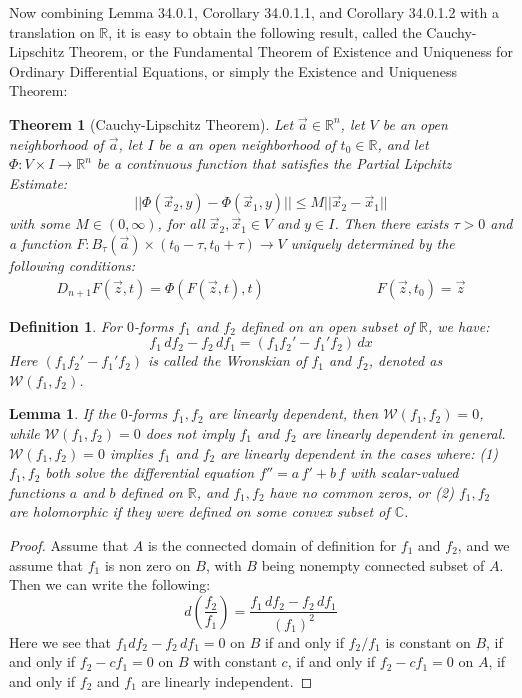 \documentclass[15pt]{book}
\theoremstyle{break}
\theoremstyle{break}
\newtheorem{thm}{Theorem}[section]
\newtheorem{lem}{Lemma}[thm]
\newtheorem{defn}{Definition}[corL]
\newcommand{\R}{\mathbb{R}}
\newcommand{\Complex}{\mathbb{C}}
\begin{document}
Now combining Lemma 34.0.1, Corollary 34.0.1.1, and Corollary 34.0.1.2 with a translation on $\R$, it is easy to obtain the following result, called the Cauchy-Lipschitz Theorem, or the Fundamental Theorem of Existence and Uniqueness for Ordinary Differential Equations, or simply the Existence and Uniqueness Theorem:
\begin{thm}[Cauchy-Lipschitz Theorem]
Let $\vec{a}\in \R^n$, let $V$ be an open neighborhood of $\vec{a}$, let $I$ be a an open neighborhood of $t_0 \in \R$, and let $\Phi:V \times I \to \R^n$ be a continuous function that satisfies the Partial Lipchitz Estimate:
$$||\Phi(\vec{x}_2, y) - \Phi(\vec{x}_1,y)|| \leq M||\vec{x}_2-\vec{x}_1||$$
with some $M \in (0,\infty)$, for all $\vec{x}_2,\vec{x}_1 \in V$ and $y \in I$. Then there exists $\tau >0$ and a function $F:B_{\tau}(\vec{a}) \times (t_0 - \tau, t_0 + \tau) \to V$ uniquely determined by the following conditions:
\begin{align*}
D_{n+1}F(\vec{z},t) = \Phi(F(\vec{z},t),t) \qquad\qquad\qquad\qquad F(\vec{z},t_0) = \vec{z}
\end{align*}
\end{thm}

\begin{defn}
For $0$-forms $f_1$ and $f_2$ defined on an open subset of $\R$, we have:
$$f_1\, df_2 - f_2\, df_1 = (f_1f_2' - f_1' f_2) \, dx$$ 
Here $(f_1f_2' - f_1' f_2)$ is called the Wronskian of $f_1$ and $f_2$, denoted as $\mathcal{W}(f_1,f_2)$.
\end{defn}

\begin{lem}
If the $0$-forms $f_1,f_2$ are linearly dependent, then $\mathcal{W}(f_1,f_2) = 0$, while $\mathcal{W}(f_1,f_2) = 0$ does not imply $f_1$ and $f_2$ are linearly dependent in general. $\mathcal{W}(f_1,f_2) = 0$ implies $f_1$ and $f_2$ are linearly dependent in the cases where: (1) $f_1,f_2$ both solve the differential equation $f'' = a\, f' + b\, f$ with scalar-valued functions $a$ and $b$ defined on $\R$, and $f_1,f_2$ have no common zeros, or (2) $f_1,f_2$ are holomorphic if they were defined on some convex subset of $\Complex$. 
\end{lem}
\begin{proof}
Assume that $A$ is the connected domain of definition for $f_1$ and $f_2$, and we assume that $f_1$ is non zero on $B$, with $B$ being nonempty connected subset of $A$. Then we can write the following:
$$d\left(\frac{f_2}{f_1}\right)=\frac{f_1\, df_2 - f_2 \, df_1}{(f_1)^2}$$
Here we see that ${f_1 df_2 - f_2 \, df_1} = 0$ on $B$ if and only if $f_2/f_1$ is constant on $B$, if and only if $f_2 -cf_1 = 0$ on $B$ with constant $c$, if and only if $f_2 - cf_1 = 0$ on $A$, if and only if $f_2$ and $f_1$ are linearly independent. 
\end{proof}
\end{document}

